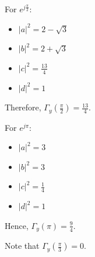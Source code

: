 For $e^{j\frac{\pi}{2}}$:
\begin{itemize}
    \item $\left\lvert a \right\rvert^2=2-\sqrt{3}$
    \item $\left\lvert b \right\rvert^2=2+\sqrt{3}$
    \item $\left\lvert c \right\rvert^2=\frac{13}{4}$
    \item $\left\lvert d \right\rvert^2=1$
\end{itemize}
Therefore, $\Gamma_y\left(\frac{\pi}{2}\right)=\frac{13}{4}$.

For $e^{j\pi}$:
\begin{itemize}
    \item $\left\lvert a \right\rvert^2=3$
    \item $\left\lvert b \right\rvert^2=3$
    \item $\left\lvert c \right\rvert^2=\frac{1}{4}$
    \item $\left\lvert d \right\rvert^2=1$
\end{itemize}
Hence, $\Gamma_y\left(\pi\right)=\frac{9}{4}$.

Note that $\Gamma_y\left(\frac{\pi}{3}\right)=0$.
